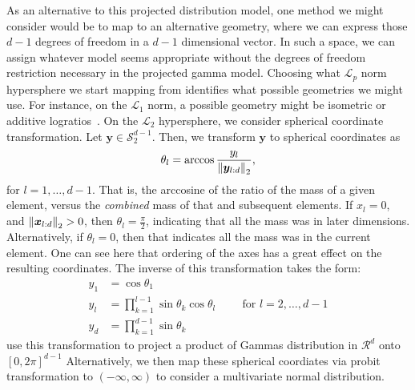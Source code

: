 As an alternative to this projected distribution model, one method we might consider would be to map
  to an alternative geometry, where we can express those $d-1$ degrees of freedom in a $d-1$
  dimensional vector.  In such a space, we can assign whatever model seems appropriate without the
  degrees of freedom restriction necessary in the projected gamma model.  Choosing what $\mathcal{L}_p$
  norm hypersphere we start mapping from identifies what possible geometries we might use.  For instance,
  on the $\mathcal{L}_1$ norm, a possible geometry might be isometric or additive
  logratios~\citep{aitchison1982}.  On the $\mathcal{L}_2$ hypersphere, we consider spherical
  coordinate transformation. Let $\bm{y} \in \mathcal{S}_{2}^{d-1}$. Then, we transform $\bm{y}$
  to spherical coordinates as
  \begin{equation*}
    \theta_l = \arccos\frac{y_l}{\left\lVert \bm{y}_{l:d} \right\rVert_{2}},
  \end{equation*}
  for $l = 1,\ldots, d-1$. That is, the arccosine of the ratio of the mass of a given element,
  versus the \emph{combined} mass of that and subsequent elements.  If $x_l = 0$, and
  $\left\lVert \bm{x}_{l:d} \right\rVert_{2} > 0$, then $\theta_l = \frac{\pi}{2}$, indicating that all the mass was
  in later dimensions.  Alternatively, if $\theta_l = 0$, then that indicates all the mass was in
  the current element.  One can see here that ordering of the axes has a great effect on the
  resulting coordinates.  The inverse of this transformation takes the form:
  \begin{equation}
    \label{eqn:spherical}
    \begin{aligned}
      y_1 &= \cos\theta_1\\
      y_l &= \prod_{k = 1}^{l-1}\sin\theta_k\cos\theta_l \hspace{1cm}\text{for } l = 2,\ldots,d-1\\
      y_d &= \prod_{k = 1}^{d-1}\sin\theta_k
    \end{aligned}
  \end{equation}
  \cite{nunez2019} use this transformation to project a product of Gammas distribution in
  $\mathcal{R}^d$ onto $[0,2\pi]^{d-1}$ Alternatively, we then map these spherical coordiates via
  probit transformation to $(-\infty,\infty)$ to consider a multivariate normal distribution.

